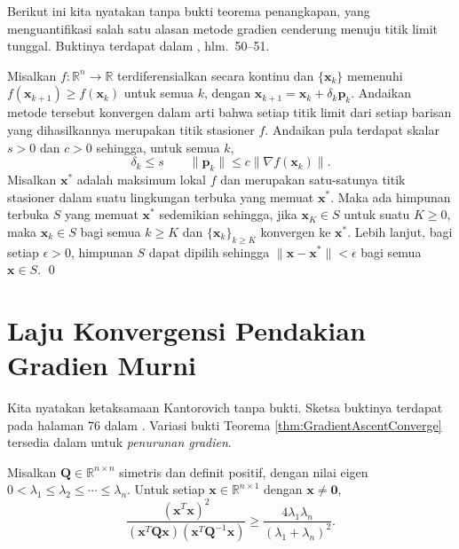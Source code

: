 \begin{remark} Berikut ini kita nyatakan tanpa bukti teorema penangkapan, yang menguantifikasi salah satu alasan metode gradien cenderung menuju titik limit tunggal. Buktinya terdapat dalam \cite{Bert99}, hlm.~50--51.
\end{remark}

\begin{theorem} Misalkan $f:\mathbb{R}^n\rightarrow\mathbb{R}$ terdiferensialkan secara kontinu dan $\{\mathbf{x}_k\}$ memenuhi $f(\mathbf{x}_{k+1})\geq f(\mathbf{x}_k)$ untuk semua $k$, dengan $\mathbf{x}_{k+1}=\mathbf{x}_k+\delta_k\mathbf{p}_k$. Andaikan metode tersebut konvergen dalam arti bahwa setiap titik limit dari setiap barisan yang dihasilkannya merupakan titik stasioner $f$. Andaikan pula terdapat skalar $s>0$ dan $c>0$ sehingga, untuk semua $k$,
\begin{equation}
\delta_k\leq s\qquad
\lVert\mathbf{p}_k\rVert\leq c\lVert\nabla f(\mathbf{x}_k)\rVert.
\end{equation}
Misalkan $\mathbf{x}^*$ adalah maksimum lokal $f$ dan merupakan satu-satunya titik stasioner dalam suatu lingkungan terbuka yang memuat $\mathbf{x}^*$. Maka ada himpunan terbuka $S$ yang memuat $\mathbf{x}^*$ sedemikian sehingga, jika $\mathbf{x}_K\in S$ untuk suatu $K\geq0$, maka $\mathbf{x}_k\in S$ bagi semua $k\geq K$ dan $\{\mathbf{x}_k\}_{k\geq K}$ konvergen ke $\mathbf{x}^*$. Lebih lanjut, bagi setiap $\epsilon>0$, himpunan $S$ dapat dipilih sehingga $\lVert\mathbf{x}-\mathbf{x}^*\rVert<\epsilon$ bagi semua $\mathbf{x}\in S$. \hfill\qed
\end{theorem}

\section{Laju Konvergensi Pendakian Gradien Murni}
\begin{remark} Kita nyatakan ketaksamaan Kantorovich tanpa bukti. Sketsa buktinya terdapat pada halaman 76 dalam \cite{Bert99}. Variasi bukti Teorema \ref{thm:GradientAscentConverge} tersedia dalam \cite{Bert99} untuk \textit{penurunan gradien}.
\end{remark}

\begin{lemma}
\label{lem:Kantorovich}
Misalkan $\mathbf{Q}\in\mathbb{R}^{n\times n}$ simetris dan definit positif, dengan nilai eigen $0<\lambda_1\leq\lambda_2\leq\cdots\leq\lambda_n$. Untuk setiap $\mathbf{x}\in\mathbb{R}^{n\times1}$ dengan $\mathbf{x}\neq\mathbf{0}$,
\begin{equation}
\frac{(\mathbf{x}^T\mathbf{x})^2}
{(\mathbf{x}^T\mathbf{Q}\mathbf{x})(\mathbf{x}^T\mathbf{Q}^{-1}\mathbf{x})}
\geq\frac{4\lambda_1\lambda_n}{(\lambda_1+\lambda_n)^2}.
\end{equation}
\end{lemma}

